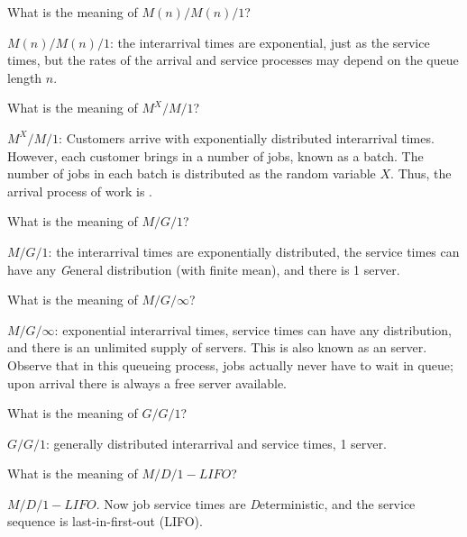 \begin{exercise}
  What is the meaning of $M(n)/M(n)/1$?
  \begin{solution}
$M(n)/M(n)/1$: the interarrival times are exponential, just as
  the service times, but the rates of the arrival and service processes
  may depend on the queue length $n$. 
  \end{solution}
\end{exercise}


\begin{exercise}
  What is the meaning of $M^X/M/1$?
  \begin{solution}
 $M^X/M/1$: Customers arrive with exponentially distributed
  interarrival times. However, each customer brings in a number of
  jobs, known as a batch. The number of jobs in each batch is
  distributed as the random variable $X$. Thus, the arrival process of
  work is .
  \end{solution}
\end{exercise}

\begin{exercise}
  What is the meaning of $M/G/1$?
  \begin{solution}
$M/G/1$: the interarrival times are exponentially distributed,
  the service times can have any \emph{G}eneral distribution (with
  finite mean), and there is 1 server.
  \end{solution}
\end{exercise}


\begin{exercise}
  What is the meaning of $M/G/\infty$?
  \begin{solution}
 $M/G/\infty$: exponential interarrival times, service times can
  have any distribution, and there is an unlimited supply of
  servers. This is also known as an  server. Observe
  that in this queueing process, jobs actually never have to wait in
  queue; upon arrival there is always a free server available.
  \end{solution}
\end{exercise}

\begin{exercise}
  What is the meaning of $G/G/1$?
  \begin{solution}
 $G/G/1$: generally distributed interarrival and service times, 1 server.
  \end{solution}
\end{exercise}

\begin{exercise}
  What is the meaning of $M/D/1-LIFO$?
  \begin{solution}
 $M/D/1-LIFO$.  Now job service times are \emph{D}eterministic, and the service sequence is last-in-first-out (LIFO).
  \end{solution}
\end{exercise}

